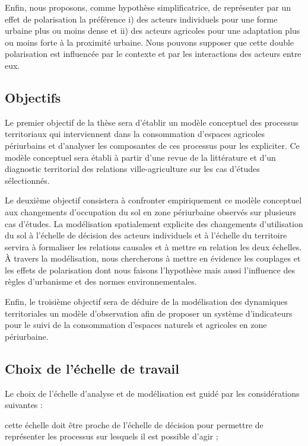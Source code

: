 Enfin, nous proposons, comme hypothèse simplificatrice,
de représenter par un effet de polarisation la préférence
i) des acteurs individuels pour une forme urbaine plus ou moins dense
et ii) des acteurs agricoles pour une adaptation plus ou moins forte
à la proximité urbaine. Nous pouvons supposer que
cette double polarisation est influencée
par le contexte et par les interactions des acteurs entre eux.	


\subsection{Objectifs}

Le premier objectif de la thèse sera d'établir
un modèle conceptuel des processus territoriaux
qui interviennent dans la consommation d'espaces agricoles périurbains
et d'analyser les composantes de ces processus pour les expliciter.
Ce modèle conceptuel sera établi à partir d'une revue de la littérature
et d'un diagnostic territorial des relations ville-agriculture
sur les cas d'études sélectionnés.

Le deuxième objectif consistera à confronter empiriquement
ce modèle conceptuel aux changements d'occupation
du sol en zone périurbaine observés sur plusieurs cas d'études.
La modélisation spatialement explicite des changements d'utilisation du sol
à l'échelle de décision des acteurs individuels
et à l'échelle du territoire servira à formaliser les relations causales
et à mettre en relation les deux échelles.
À travers la modélisation, nous chercherons à mettre en évidence
les couplages et les effets de polarisation dont nous faisons l'hypothèse
mais aussi l'influence des règles d'urbanisme et des normes environnementales.

Enfin, le troisième objectif sera de déduire de la modélisation
des dynamiques territoriales un modèle
d'observation afin de proposer un système d'indicateurs
pour le suivi de la consommation d'espaces naturels et agricoles
en zone périurbaine.


\subsection{Choix de l'échelle de travail}

Le choix de l'échelle d'analyse et de modélisation est guidé
par les considérations suivantes :

\startitemize

\item cette échelle doit être proche de l'échelle de décision
  pour permettre de représenter les processus sur lesquels il est possible
  d'agir ;

